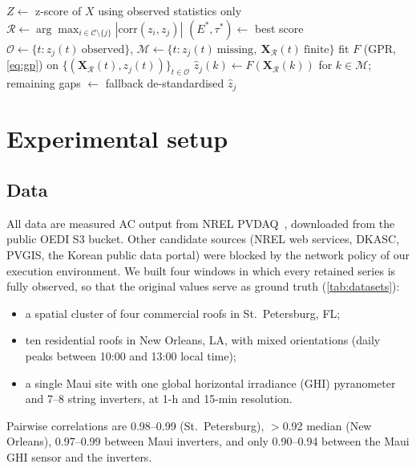 \documentclass[11pt,a4paper]{article}
\begin{document}
\begin{algorithm}[t]
\caption{FPRM imputation of one incomplete series (our implementation)}\label{alg:fprm}
$Z \leftarrow$ z-score of $X$ using observed statistics only\;
$\mathcal{R} \leftarrow \arg\max_{i\in\mathcal{C}\setminus\{j\}} |\mathrm{corr}(z_i,z_j)|$ 
$(E^*,\tau^*) \leftarrow$ best score\;
$\mathcal{O}\leftarrow\{t: z_j(t)\ \text{observed}\}$, $\mathcal{M}\leftarrow\{t: z_j(t)\ \text{missing},\ \mathbf{X}_{\mathcal{R}}(t)\ \text{finite}\}$\;
fit $F$ (GPR, \cref{eq:gp}) on $\{(\mathbf{X}_{\mathcal{R}}(t), z_j(t))\}_{t\in\mathcal{O}}$\;
$\hat z_j(k) \leftarrow F(\mathbf{X}_{\mathcal{R}}(k))$ for $k\in\mathcal{M}$; remaining gaps $\leftarrow$ fallback\;
\Return de-standardised $\hat z_j$\;
\end{algorithm}

\section{Experimental setup}\label{sec:setup}

\subsection{Data}

All data are measured AC output from NREL PVDAQ~\cite{pvdaq}, downloaded from the public OEDI S3 bucket.
Other candidate sources (NREL web services, DKASC, PVGIS, the Korean public data portal) were blocked by the network policy of our execution environment.
We built four windows in which every retained series is fully observed, so that the original values serve as ground truth (\cref{tab:datasets}):
\begin{itemize}
  \item a spatial cluster of four commercial roofs in St.\ Petersburg, FL;
  \item ten residential roofs in New Orleans, LA, with mixed orientations (daily peaks between 10:00 and 13:00 local time);
  \item a single Maui site with one global horizontal irradiance (GHI) pyranometer and 7--8 string inverters, at 1-h and 15-min resolution.
\end{itemize}
Pairwise correlations are 0.98--0.99 (St.\ Petersburg), $>$0.92 median (New Orleans), 0.97--0.99 between Maui inverters, and only 0.90--0.94 between the Maui GHI sensor and the inverters.
\end{document}
